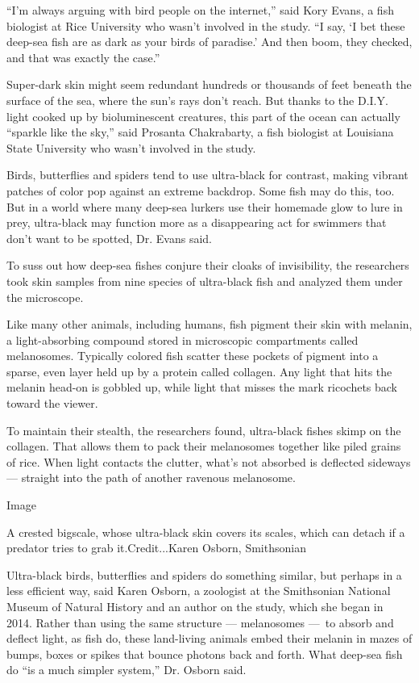 ``I'm always arguing with bird people on the internet,'' said Kory
Evans, a fish biologist at Rice University who wasn't involved in the
study. ``I say, `I bet these deep-sea fish are as dark as your birds of
paradise.' And then boom, they checked, and that was exactly the case.''

Super-dark skin might seem redundant hundreds or thousands of feet
beneath the surface of the sea, where the sun's rays don't reach. But
thanks to the D.I.Y. light cooked up by bioluminescent creatures, this
part of the ocean can actually ``sparkle like the sky,'' said Prosanta
Chakrabarty, a fish biologist at Louisiana State University who wasn't
involved in the study.

Birds, butterflies and spiders tend to use ultra-black for contrast,
making vibrant patches of color pop against an extreme backdrop. Some
fish may do this, too. But in a world where many deep-sea lurkers use
their homemade glow to lure in prey, ultra-black may function more as a
disappearing act for swimmers that don't want to be spotted, Dr. Evans
said.

To suss out how deep-sea fishes conjure their cloaks of invisibility,
the researchers took skin samples from nine species of ultra-black fish
and analyzed them under the microscope.

Like many other animals, including humans, fish pigment their skin with
melanin, a light-absorbing compound stored in microscopic compartments
called melanosomes. Typically colored fish scatter these pockets of
pigment into a sparse, even layer held up by a protein called collagen.
Any light that hits the melanin head-on is gobbled up, while light that
misses the mark ricochets back toward the viewer.

To maintain their stealth, the researchers found, ultra-black fishes
skimp on the collagen. That allows them to pack their melanosomes
together like piled grains of rice. When light contacts the clutter,
what's not absorbed is deflected sideways --- straight into the path of
another ravenous melanosome.

Image

A crested bigscale, whose ultra-black skin covers its scales, which can
detach if a predator tries to grab it.Credit...Karen Osborn, Smithsonian

Ultra-black birds, butterflies and spiders do something similar, but
perhaps in a less efficient way, said Karen Osborn, a zoologist at the
Smithsonian National Museum of Natural History and an author on the
study, which she began in 2014. Rather than using the same structure ---
melanosomes ---~to absorb and deflect light, as fish do, these
land-living animals embed their melanin in mazes of bumps, boxes or
spikes that bounce photons back and forth. What deep-sea fish do ``is a
much simpler system,'' Dr. Osborn said.

